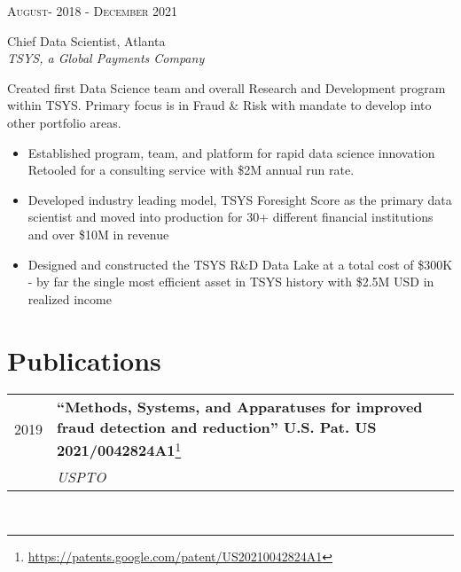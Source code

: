 \documentclass[10pt]{article} %
\begin{document}
\begin{minipage}[t]{0.5\textwidth}
{\raggedleft\textsc{August- 2018 - December 2021}\par}

{\raggedright\large Chief Data Scientist, Atlanta\\ 
\textit{TSYS, a Global Payments Company}\\[5pt]}

\normalsize{Created first Data Science team and overall Research and Development program within TSYS. Primary focus is in Fraud \& Risk with mandate to develop into other portfolio areas. \\
\begin{itemize}
\item Established program, team, and platform for rapid data science innovation Retooled for a consulting service with  \$2M annual run rate.  
\item Developed industry leading model, TSYS Foresight Score as the primary data scientist and moved into production for 30+ different financial institutions and over \$10M in revenue
\item Designed and constructed the TSYS R\&D Data Lake at a total cost of \$300K - by far the single most efficient asset in TSYS history with \$2.5M USD in realized income
\end{itemize}}







\section{Publications} 

\begin{tabular}{rl}
2019 & \parbox{0.75\textwidth}{\textbf{“Methods, Systems, and Apparatuses for improved fraud detection and reduction” U.S. Pat. US 2021/0042824A1}\footnote{\url{https://patents.google.com/patent/US20210042824A1}}}\\
& \textit{USPTO} \\
\end{tabular}\\[10pt]
\end{minipage} %
\hfill
\end{document}
